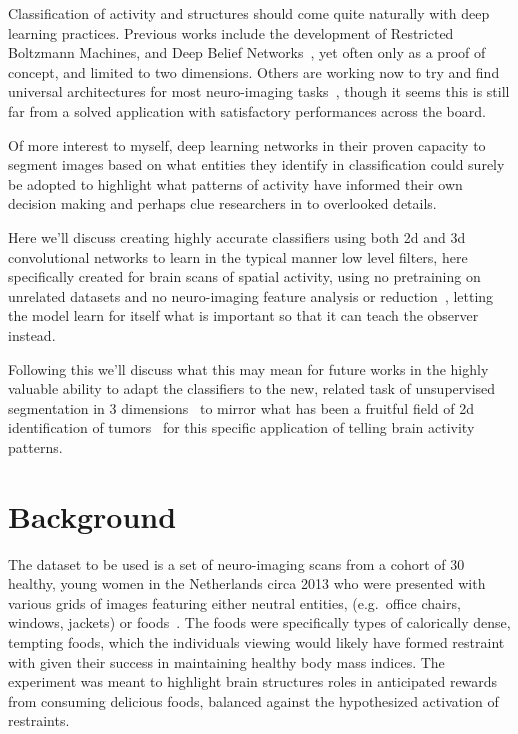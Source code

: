 \documentclass[10pt,twocolumn,letterpaper]{article}
\begin{document}
Classification of activity and structures should come quite naturally with deep learning practices.
Previous works include the development of Restricted Boltzmann Machines, and Deep Belief Networks~\cite{plis2014deep},
yet often only as a proof of concept, and limited to two dimensions.
Others are working now to try and find universal architectures for most
neuro-imaging tasks~\cite{henschel2019fastsurfer}, though it seems this is still far from a solved
application with satisfactory performances across the board.

Of more interest to myself, deep learning networks in their proven capacity to segment images based on what entities
they identify in classification could surely be adopted to highlight what patterns of activity have informed their
own decision making and perhaps clue researchers in to overlooked details.

Here we'll discuss creating highly accurate classifiers using both 2d and 3d convolutional networks
to learn in the typical manner low level filters, here specifically created for brain scans of spatial activity, using
no pretraining on unrelated datasets and no neuro-imaging feature analysis or reduction~\cite{shi2018feature},
letting the model learn for itself what is important so that it can teach the observer instead.

Following this we'll discuss what this may mean for future works in the highly valuable ability to adapt the classifiers
to the new, related task of unsupervised segmentation in 3 dimensions~\cite{shu2016unsupervised} to mirror what has been
a fruitful field of 2d identification of tumors~\cite{akkus2017deep} for this specific application of telling brain
activity patterns.

\section{Background}\label{sec:background}

The dataset to be used is a set of neuro-imaging scans from a cohort of 30 healthy, young women in the
Netherlands circa 2013 who were presented with various grids of images featuring
either neutral entities, (e.g.\ office chairs, windows, jackets) or foods~\cite{smeets2013allured}.
The foods were specifically types of calorically dense, tempting foods, which the individuals viewing would likely
have formed restraint with given their success in maintaining healthy body mass indices.
The experiment was meant to highlight brain structures roles in anticipated rewards from consuming delicious foods,
balanced against the hypothesized activation of restraints.
\end{document}
